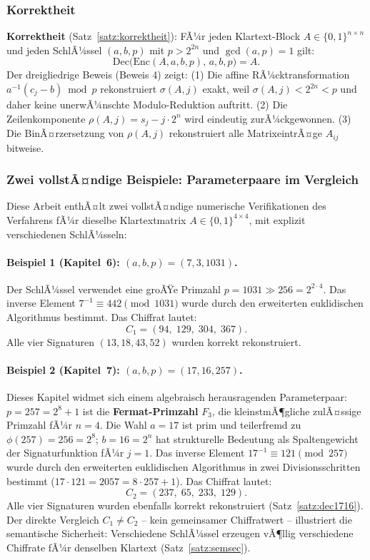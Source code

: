 ﻿\documentclass[a4paper,12pt]{scrreprt}
\theoremstyle{definition}
\begin{document}
\subsubsection{Korrektheit}

\textbf{Korrektheit} (Satz~\ref{satz:korrektheit}): FÃ¼r jeden Klartext-Block $A \in \{0,1\}^{n\times n}$ und jeden SchlÃ¼ssel $(a,b,p)$ mit $p > 2^{2n}$ und $\gcd(a,p)=1$ gilt:
\[
\mathrm{Dec}\bigl(\mathrm{Enc}(A,a,b,p),\,a,b,p\bigr) = A.
\]
Der dreigliedrige Beweis (Beweis 4) zeigt: (1) Die affine RÃ¼cktransformation $a^{-1}(c_j - b) \bmod p$ rekonstruiert $\sigma(A,j)$ exakt, weil $\sigma(A,j) < 2^{2n} < p$ und daher keine unerwÃ¼nschte Modulo-Reduktion auftritt. (2) Die Zeilenkomponente $\rho(A,j) = s_j - j \cdot 2^n$ wird eindeutig zurÃ¼ckgewonnen. (3) Die BinÃ¤rzersetzung von $\rho(A,j)$ rekonstruiert alle MatrixeintrÃ¤ge $A_{ij}$ bitweise.

\subsubsection{Zwei vollstÃ¤ndige Beispiele: Parameterpaare im Vergleich}

Diese Arbeit enthÃ¤lt zwei vollstÃ¤ndige numerische Verifikationen des Verfahrens fÃ¼r dieselbe Klartextmatrix $A \in \{0,1\}^{4\times4}$, mit explizit verschiedenen SchlÃ¼sseln:

\paragraph{Beispiel 1 (Kapitel~6): $(a, b, p) = (7, 3, 1031)$.}
Der SchlÃ¼ssel verwendet eine groÃŸe Primzahl $p = 1031 \gg 256 = 2^{2 \cdot 4}$. Das inverse Element $7^{-1} \equiv 442 \pmod{1031}$ wurde durch den erweiterten euklidischen Algorithmus bestimmt. Das Chiffrat lautet:
\[
C_1 = (94,\; 129,\; 304,\; 367).
\]
Alle vier Signaturen $(13, 18, 43, 52)$ wurden korrekt rekonstruiert.

\paragraph{Beispiel 2 (Kapitel~7): $(a, b, p) = (17, 16, 257)$.}
Dieses Kapitel widmet sich einem algebraisch herausragenden Parameterpaar: $p = 257 = 2^8 + 1$ ist die \textbf{Fermat-Primzahl} $F_3$, die kleinstmÃ¶gliche zulÃ¤ssige Primzahl fÃ¼r $n=4$. Die Wahl $a = 17$ ist prim und teilerfremd zu $\phi(257) = 256 = 2^8$; $b = 16 = 2^n$ hat strukturelle Bedeutung als Spaltengewicht der Signaturfunktion fÃ¼r $j=1$. Das inverse Element $17^{-1} \equiv 121 \pmod{257}$ wurde durch den erweiterten euklidischen Algorithmus in zwei Divisionsschritten bestimmt ($17 \cdot 121 = 2057 = 8 \cdot 257 + 1$). Das Chiffrat lautet:
\[
C_2 = (237,\; 65,\; 233,\; 129).
\]
Alle vier Signaturen wurden ebenfalls korrekt rekonstruiert (Satz~\ref{satz:dec1716}). Der direkte Vergleich $C_1 \neq C_2$ -- kein gemeinsamer Chiffratwert -- illustriert die semantische Sicherheit: Verschiedene SchlÃ¼ssel erzeugen vÃ¶llig verschiedene Chiffrate fÃ¼r denselben Klartext (Satz~\ref{satz:semsec}).
\end{document}
